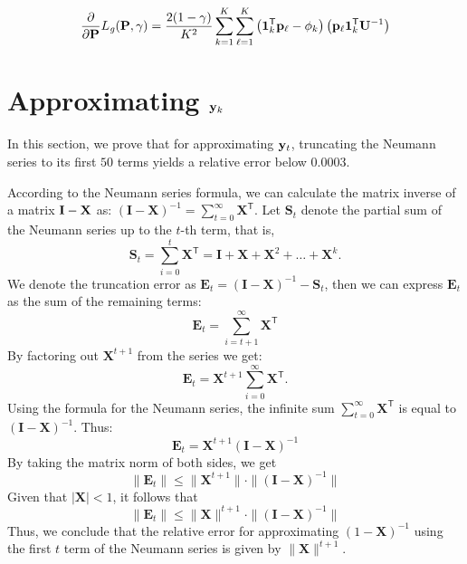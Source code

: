 \begin{equation}
\begin{aligned}
\label{eq:gradient_cross_fairness_loss}
    \frac{\partial}{\partial \mathbf{{P}}} L_{\mathit{g}}(\mathbf{{P}}, \gamma) 
         = \frac{2 (1-\gamma)}{K^2} \sum_{k=1}^{K} 
         \sum_{\ell=1}^{K} \left(\mathbf{{1}}_{k}^{\mathsf{T}} \mathbf{{p}}_{\ell} - \phi_k\right) \left( \mathbf{{p}}_{\ell} \mathbf{{1}}_{k}^{\mathsf{T}} \mathbf{{U}}^{-1} \right)         
\end{aligned}
\end{equation}



\section{Approximating $\mathbf{{y}}_k$}
\label{appendix:Neumann series}

In this section, we prove that for approximating $\mathbf{{y}}_t$, truncating the Neumann series to its first $50$ terms yields a relative error below $0.0003$.

According to the Neumann series formula, we can calculate the matrix inverse of a matrix $\mathbf{{I}} - \textbf{X}$ as: 
$
(\textbf{I} - \textbf{X})^{-1} = \sum_{t=0}^\infty \textbf{X}^{\mathsf{T}}.
$ 
Let $\textbf{S}_t$ denote the partial sum of the Neumann series up to the $t$-th term, that is,
\begin{equation*}
    \textbf{S}_t = \sum_{i=0}^t \textbf{X}^{\mathsf{T}} = \textbf{I} + \textbf{X} + \textbf{X}^2 + \dots + \textbf{X}^k.
\end{equation*}
We denote the truncation error as
$
\textbf{E}_t = (\textbf{I} - \textbf{X})^{-1} - \textbf{S}_t
$, then we can express $\textbf{E}_t$ as the sum of the remaining terms:
\begin{equation*}
    \textbf{E}_t = \sum_{i=t+1}^\infty \textbf{X}^{\mathsf{T}}
\end{equation*}
By factoring out $\textbf{X}^{t+1}$ from the series we get:
\begin{equation*}
    \textbf{E}_t = \textbf{X}^{t+1} \sum_{i=0}^\infty \textbf{X}^{\mathsf{T}}.
\end{equation*}
Using the formula for the Neumann series, the infinite sum $\sum_{t=0}^\infty \textbf{X}^{\mathsf{T}}$ is equal to $(\textbf{I} - \textbf{X})^{-1}$. Thus:
\begin{equation*}
    \textbf{E}_t = \textbf{X}^{t+1} (\textbf{I} - \textbf{X})^{-1}
\end{equation*}
By taking the matrix norm of both sides, we get
\begin{equation*}
    \|\textbf{E}_t\| \leq \|\textbf{X}^{t+1}\| \cdot \|(\textbf{I} - \textbf{X})^{-1}\|
\end{equation*}
Given that $|\textbf{X}|<1$, it follows that
\begin{equation*}
    \|\textbf{E}_t\| \leq \|\textbf{X}\|^{t+1} \cdot \|(\textbf{I} - \textbf{X})^{-1}\|
\end{equation*}
Thus, we conclude that the relative error for approximating $(1-\textbf{X})^{-1}$ using the first $t$ term of the Neumann series is given by $\|\textbf{X}\|^{t+1}$.

